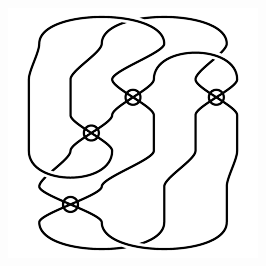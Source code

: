 \begin{figure}[H]
\begin{minipage}[b]{.18\linewidth}
\end{minipage}
\begin{minipage}[b]{.18\linewidth}
\centering
\includegraphics[width=\linewidth]{../data/virtual_4_66.png}
\end{minipage}
\end{figure}

